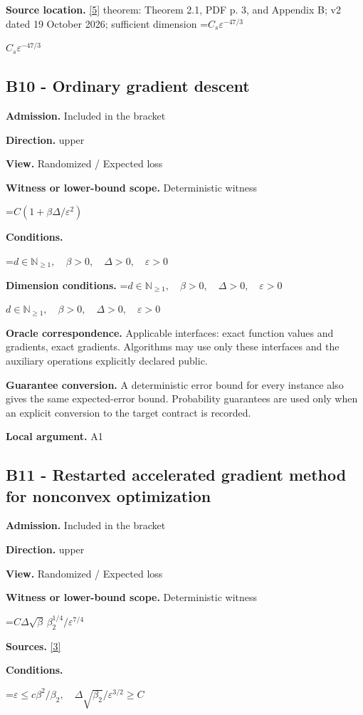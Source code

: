 \documentclass[10pt,a4paper]{article}
\newcommand{\AtlasMath}[1]{\par\begingroup\centering\setbox0=\hbox{$\displaystyle #1$}\ifdim\wd0>1.4\linewidth\typeout{ATLAS WIDE FORMULA: \the\wd0}\fi\ifdim\wd0>\linewidth\resizebox{\linewidth}{!}{\box0}\else\box0\fi\par\endgroup}
\newcommand{\AtlasInlineMath}[1]{\begingroup\setbox0=\hbox{$#1$}\ifdim\wd0>.4\linewidth\endgroup\AtlasMath{#1}\else\endgroup$#1$\fi}
\begin{document}
\textbf{Source location.} \href{https://arxiv.org/pdf/2610.17074v2}{[5]} theorem: Theorem 2.1, PDF p. 3, and Appendix B; v2 dated 19 October 2026; sufficient dimension \AtlasInlineMath{C_s\varepsilon^{-47/3}}

\subsection{B10 - Ordinary gradient descent}
\textbf{Admission.} Included in the bracket

\textbf{Direction.} upper

\textbf{View.} Randomized / Expected loss

\textbf{Witness or lower-bound scope.} Deterministic witness

\AtlasMath{C(1+\beta\Delta/\varepsilon^2)}
\textbf{Conditions.} 
\AtlasMath{d\in\mathbb{N}_{\ge1},\quad \beta>0,\quad \Delta>0,\quad \varepsilon>0}


\textbf{Dimension conditions.} \AtlasInlineMath{d\in\mathbb{N}_{\ge1},\quad \beta>0,\quad \Delta>0,\quad \varepsilon>0}

\textbf{Oracle correspondence.} Applicable interfaces: exact function values and gradients, exact gradients. Algorithms may use only these interfaces and the auxiliary operations explicitly declared public.

\textbf{Guarantee conversion.} A deterministic error bound for every instance also gives the same expected-error bound. Probability guarantees are used only when an explicit conversion to the target contract is recorded.

\textbf{Local argument.} A1

\subsection{B11 - Restarted accelerated gradient method for nonconvex optimization}
\textbf{Admission.} Included in the bracket

\textbf{Direction.} upper

\textbf{View.} Randomized / Expected loss

\textbf{Witness or lower-bound scope.} Deterministic witness

\AtlasMath{C\Delta\sqrt\beta\,\beta_2^{1/4}/\varepsilon^{7/4}}
\textbf{Sources.} \href{https://jmlr.org/papers/volume24/22-0522/22-0522.pdf}{[3]}

\textbf{Conditions.} 
\AtlasMath{\varepsilon\le c\beta^2/\beta_2,\quad\Delta\sqrt{\beta_2}/\varepsilon^{3/2}\ge C}
\end{document}
